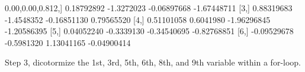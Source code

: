 \documentclass[
]{article}
\newenvironment{Shaded}{\begin{snugshade}}{\end{snugshade}}
\newcommand{\DecValTok}[1]{\textcolor[rgb]{0.00,0.00,0.81}{#1}}
\newcommand{\FloatTok}[1]{\textcolor[rgb]{0.00,0.00,0.81}{#1}}
\newcommand{\NormalTok}[1]{#1}
\newcommand{\SpecialCharTok}[1]{\textcolor[rgb]{0.00,0.00,0.00}{#1}}
\begin{document}
\begin{Shaded}
\begin{Highlighting}[]
\NormalTok{[}\DecValTok{2}\NormalTok{,]  }\FloatTok{0.18792892} \SpecialCharTok{{-}}\FloatTok{1.3272023} \SpecialCharTok{{-}}\FloatTok{0.06897668} \SpecialCharTok{{-}}\FloatTok{1.67448711}
\NormalTok{[}\DecValTok{3}\NormalTok{,]  }\FloatTok{0.88319683} \SpecialCharTok{{-}}\FloatTok{1.4548352} \SpecialCharTok{{-}}\FloatTok{0.16851130}  \FloatTok{0.79565520}
\NormalTok{[}\DecValTok{4}\NormalTok{,]  }\FloatTok{0.51101058}  \FloatTok{0.6041980} \SpecialCharTok{{-}}\FloatTok{1.96296845} \SpecialCharTok{{-}}\FloatTok{1.20586395}
\NormalTok{[}\DecValTok{5}\NormalTok{,]  }\FloatTok{0.04052240} \SpecialCharTok{{-}}\FloatTok{0.3339130} \SpecialCharTok{{-}}\FloatTok{0.34540695} \SpecialCharTok{{-}}\FloatTok{0.82768851}
\NormalTok{[}\DecValTok{6}\NormalTok{,] }\SpecialCharTok{{-}}\FloatTok{0.09529678} \SpecialCharTok{{-}}\FloatTok{0.5981320}  \FloatTok{1.13041165} \SpecialCharTok{{-}}\FloatTok{0.04900414}
\end{Highlighting}
\end{Shaded}

Step 3, dicotormize the 1st, 3rd, 5th, 6th, 8th, and 9th variable within
a for-loop.
\end{document}
